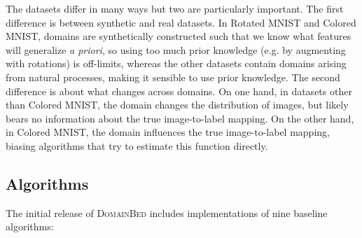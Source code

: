 \documentclass{article}
\newcommand{\domainbed}{\textsc{DomainBed}\xspace}
\begin{document}
The datasets differ in many ways but two are particularly important.
The first difference is between synthetic and real datasets.
In Rotated MNIST and Colored MNIST, domains are synthetically constructed such that we know what features will generalize \textit{a priori}, so using too much prior knowledge (e.g. by augmenting with rotations) is off-limits, whereas the other datasets contain domains arising from natural processes, making it sensible to use prior knowledge.
The second difference is about what changes across domains.
On one hand, in datasets other than Colored MNIST, the domain changes the distribution of images, but likely bears no information about the true image-to-label mapping.
On the other hand, in Colored MNIST, the domain influences the true image-to-label mapping, biasing algorithms that try to estimate this function directly.

\subsection{Algorithms}
\label{sec:algorithms}

The initial release of \domainbed includes implementations of nine baseline algorithms:
\end{document}
